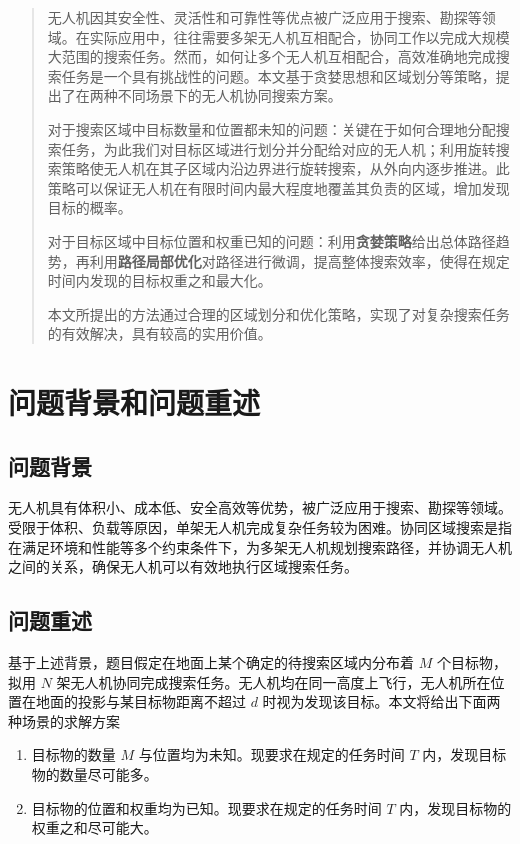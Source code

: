 \documentclass[bwprint]{gmcmthesis}
\numberwithin{figure}{section}
\begin{document}
 \begin{abstract}
	无人机因其安全性、灵活性和可靠性等优点被广泛应用于搜索、勘探等领域。在实际应用中，往往需要多架无人机互相配合，协同工作以完成大规模大范围的搜索任务。然而，如何让多个无人机互相配合，高效准确地完成搜索任务是一个具有挑战性的问题。本文基于贪婪思想和区域划分等策略，提出了在两种不同场景下的无人机协同搜索方案。

   	对于搜索区域中目标数量和位置都未知的问题：关键在于如何合理地分配搜索任务，为此我们对目标区域进行划分并分配给对应的无人机；利用旋转搜索策略使无人机在其子区域内沿边界进行旋转搜索，从外向内逐步推进。此策略可以保证无人机在有限时间内最大程度地覆盖其负责的区域，增加发现目标的概率。
	
	对于目标区域中目标位置和权重已知的问题：利用\textbf{贪婪策略}给出总体路径趋势，再利用\textbf{路径局部优化}对路径进行微调，提高整体搜索效率，使得在规定时间内发现的目标权重之和最大化。
	
	本文所提出的方法通过合理的区域划分和优化策略，实现了对复杂搜索任务的有效解决，具有较高的实用价值。

\end{abstract}


\section{问题背景和问题重述}

\subsection{问题背景}
无人机具有体积小、成本低、安全高效等优势，被广泛应用于搜索、勘探等领域。受限于体积、负载等原因，单架无人机完成复杂任务较为困难。协同区域搜索是指在满足环境和性能等多个约束条件下，为多架无人机规划搜索路径，并协调无人机之间的关系，确保无人机可以有效地执行区域搜索任务。\par

\subsection{问题重述}
基于上述背景，题目假定在地面上某个确定的待搜索区域内分布着 $M$ 个目标物，拟用 $N$ 架无人机协同完成搜索任务。无人机均在同一高度上飞行，无人机所在位置在地面的投影与某目标物距离不超过 $d$ 时视为发现该目标。本文将给出下面两种场景的求解方案\par
\begin{enumerate}
	\item 目标物的数量 $M$ 与位置均为未知。现要求在规定的任务时间 $T$ 内，发现目标物的数量尽可能多。
	\item 目标物的位置和权重均为已知。现要求在规定的任务时间 $T$ 内，发现目标物的权重之和尽可能大。
\end{enumerate}
\end{document}
